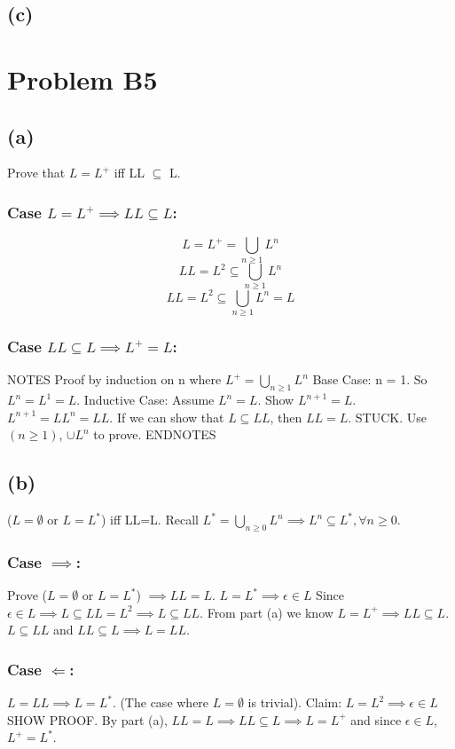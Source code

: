 \documentclass[12pt]{article}
\begin{document}
\subsection*{(c)}

\section*{Problem B5}
\subsection*{(a)} Prove that $L=L^+$ iff LL $\subseteq$ L.
\subsubsection*{Case $L=L^+ \implies LL \subseteq L$:}
$$L = L^+ = \bigcup\limits_{n\ge1} L^n$$
$$LL = L^2 \subseteq \bigcup\limits_{n\ge1} L^n$$
$$LL = L^2 \subseteq \bigcup\limits_{n\ge1} L^n = L$$

\subsubsection*{Case $LL \subseteq L \implies L^+ = L$:}
NOTES
\newline
Proof by induction on n where $L^+ = \bigcup\limits_{n\ge1} L^n$
Base Case: n = 1. So $L^n = L^1  = L$.
Inductive Case: Assume $L^n = L$.
Show $L^{n+1} =L$. 
\newline 
$L^{n+1} = LL^{n} = LL$. If we can show that $L \subseteq LL$, then 
$LL=L$.
STUCK. Use $(n \ge 1)$, $ \cup L^n$ to prove.
ENDNOTES

\subsection*{(b)}
($L=\emptyset$ or $L=L^*$) iff LL=L.
Recall $L^\ast = \bigcup\limits_{n \ge 0} L^n \implies L^n \subseteq L^\ast,
\forall n\ge 0$.
\newline
\subsubsection*{Case $\implies$:}
Prove ($L=\emptyset$ or $L=L^*$)
$\implies LL=L$. $L = L^\ast \implies {\epsilon } \in L$
Since ${\epsilon } \in L \implies L \subseteq LL = L^2 \implies L \subseteq LL$.
From part (a) we know $L=L^+ \implies LL \subseteq L$. 
$L \subseteq LL$ and $LL \subseteq L \implies L = LL$.

\subsubsection*{Case $\Longleftarrow$:} 
$L=LL \implies L = L^\ast$.
(The case where $L= \emptyset$ is trivial).
Claim: $L=L^2 \implies {\epsilon } \in L$ SHOW PROOF.
By part (a), $LL=L \implies LL \subseteq L \implies
L = L^+$ and since ${\epsilon } \in L$, $L^+=L^\ast$.
\end{document}
